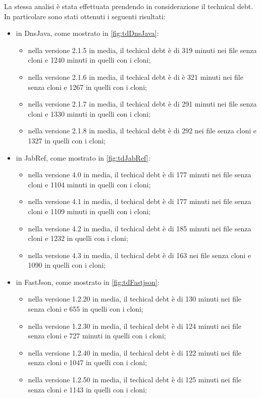 La stessa analisi è stata effettuata prendendo in considerazione il technical debt. In particolare sono stati ottenuti i seguenti risultati:
\begin{itemize}
		\item in DnsJava, come mostrato in \autoref{fig:tdDnsJava}:
	\begin{itemize}
		\item nella versione 2.1.5 in media, il techical debt è di 319 minuti nei file senza cloni e 1240 minuti in quelli con i cloni;
		\item nella versione 2.1.6 in media, il techical debt è di è 321 minuti nei file senza cloni e 1267 in quelli con i cloni;
		\item nella versione 2.1.7 in media, il techical debt è di 291 minuti nei file senza cloni e 1330 minuti in quelli con i cloni;
		\item nella versione 2.1.8 in media, il techical debt è di 292 nei file senza cloni e 1327 in quelli con i cloni;
	\end{itemize}
	\item in JabRef, come mostrato in \autoref{fig:tdJabRef}:
	\begin{itemize}
		\item nella versione 4.0 in media, il techical debt è di 177 minuti nei file senza cloni e 1104 minuti in quelli con i cloni;
		\item nella versione 4.1 in media, il techical debt è di 177 minuti nei file senza cloni e 1109 minuti in quelli con i cloni;
		\item nella versione 4.2 in media, il techical debt è di 185 minuti nei file senza cloni e 1232 in quelli con i cloni;
		\item nella versione 4.3 in media, il techical debt è di 163 nei file senza cloni e 1090 in quelli con i cloni;
	\end{itemize} 
		\item in FastJson, come mostrato in \autoref{fig:tdFastjson}:
	\begin{itemize}
		\item nella versione 1.2.20 in media, il techical debt è di 130 minuti nei file senza cloni e 655 in quelli con i cloni;
		\item nella versione 1.2.30 in media, il techical debt è di 124 minuti nei file senza cloni e 727 minuti in quelli con i cloni;
		\item nella versione 1.2.40 in media, il techical debt è di 122 minuti nei file senza cloni e 1047 in quelli con i cloni;
		\item nella versione 1.2.50 in media, il techical debt è di 125 minuti nei file senza cloni e 1143 in quelli con i cloni;
	\end{itemize}
\end{itemize}
